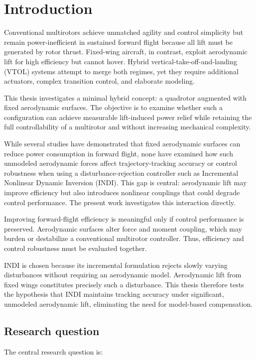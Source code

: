 
\chapter{Introduction}\label{chapter:introduction}

Conventional multirotors achieve unmatched agility and control simplicity but remain power-inefficient in sustained forward flight because all lift must be generated by rotor thrust. Fixed-wing aircraft, in contrast, exploit aerodynamic lift for high efficiency but cannot hover. Hybrid vertical-take-off-and-landing (VTOL) systems attempt to merge both regimes, yet they require additional actuators, complex transition control, and elaborate modeling.

This thesis investigates a minimal hybrid concept: a quadrotor augmented with fixed aerodynamic surfaces. The objective is to examine whether such a configuration can achieve measurable lift-induced power relief while retaining the full controllability of a multirotor and without increasing mechanical complexity.

While several studies have demonstrated that fixed aerodynamic surfaces can reduce power consumption in forward flight, none have examined how such unmodeled aerodynamic forces affect trajectory-tracking accuracy or control robustness when using a disturbance-rejection controller such as Incremental Nonlinear Dynamic Inversion (INDI). This gap is central: aerodynamic lift may improve efficiency but also introduces nonlinear couplings that could degrade control performance. The present work investigates this interaction directly.

Improving forward-flight efficiency is meaningful only if control performance is preserved. Aerodynamic surfaces alter force and moment coupling, which may burden or destabilize a conventional multirotor controller. Thus, efficiency and control robustness must be evaluated together.

INDI is chosen because its incremental formulation rejects slowly varying disturbances without requiring an aerodynamic model. Aerodynamic lift from fixed wings constitutes precisely such a disturbance. This thesis therefore tests the hypothesis that INDI maintains tracking accuracy under significant, unmodeled aerodynamic lift, eliminating the need for model-based compensation.

\section{Research question}
The central research question is:

